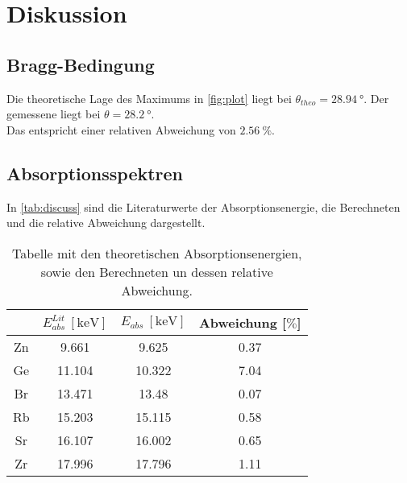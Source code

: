 \newpage
\section{Diskussion}
\label{sec:Diskussion}

\subsection{Bragg-Bedingung}
Die theoretische Lage des Maximums in \autoref{fig:plot} liegt bei $\theta_{theo} = \SI{28.94}{\degree}$.
Der gemessene liegt bei $\theta = \SI{28.2}{\degree}$.\\
Das entspricht einer relativen Abweichung von $\SI{2.56}{\percent}$.

\subsection{Absorptionsspektren}
In \autoref{tab:discuss} sind die Literaturwerte der Absorptionsenergie, die Berechneten und die relative Abweichung dargestellt.

\begin{table}
    \centering
    \caption{Tabelle mit den theoretischen Absorptionsenergien, sowie den Berechneten un dessen relative Abweichung.}
    \begin{tabular}{c c c c}
        \toprule
        $ $ & $E_{abs}^{Lit}\ [\si{\kilo\electronvolt}]$ & $E_{abs}\ [\si{\kilo\electronvolt}]$ & Abweichung [$\si{\percent}$]\\
        \midrule
        Zn & 9.661 & 9.625 & 0.37\\ \hline
        Ge & 11.104 & 10.322 & 7.04\\ \hline
        Br & 13.471 & 13.48 & 0.07\\ \hline
        Rb & 15.203 & 15.115 & 0.58\\ \hline
        Sr & 16.107 & 16.002 & 0.65\\ \hline
        Zr & 17.996 & 17.796 & 1.11\\
    \bottomrule
    \end{tabular}
    \label{tab:discuss}
\end{table}